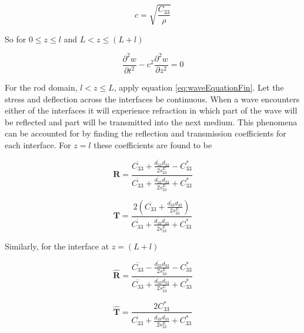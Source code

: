 \begin{equation}
c = \sqrt{\frac{C_{33}}{\rho}}
\end{equation}


So for $0 \le z \le l$ and $L < z \le (L+l)$

\begin{equation}
\frac{\partial ^2w}{\partial t^2} - c^2 \frac{\partial ^2w}{\partial z^2} = 0
\label{eq:transWaveEquationFin}
\end{equation}

For the rod domain, $l < z \le L$, apply equation \ref{eq:waveEquationFin}. Let the stress and deflection across the interfaces be continuous. When a wave encounters either of the interfaces it will experience refraction in which part of the wave will be reflected and part will be transmitted into the next medium. This phenomena can be accounted for by finding the reflection and transmission coefficients for each interface. For $z = l$ these coefficients are found to be

\begin{equation}
\boldsymbol{R} = \frac{\overline{C_{33}} + \frac{\overline{d_{33}}d_{33}}{2s^E_{33}} - C^*_{33}}{\overline{C_{33}} + \frac{\overline{d_{33}}d_{33}}{2s^E_{33}} + C^*_{33}}
\end{equation}

\begin{equation}
\boldsymbol{T} = \frac{2\left(\overline{C_{33}} + \frac{\overline{d_{33}}d_{33}}{2s^E_{33}}\right)}{\overline{C_{33}} + \frac{\overline{d_{33}}d_{33}}{2s^E_{33}} + C^*_{33}}
\end{equation}


Similarly, for the interface at $z = (L + l)$

\begin{equation}
\boldsymbol{\hat{R}} = \frac{\overline{C_{33}} - \frac{\overline{d_{33}}d_{33}}{2s^E_{33}} - C^*_{33}}{\overline{C_{33}} + \frac{\overline{d_{33}}d_{33}}{2s^E_{33}} + C^*_{33}}
\end{equation}

\begin{equation}
\boldsymbol{\hat{T}} = \frac{2C^*_{33}}{\overline{C_{33}} + \frac{\overline{d_{33}}d_{33}}{2s^E_{33}} + C^*_{33}}
\end{equation}

